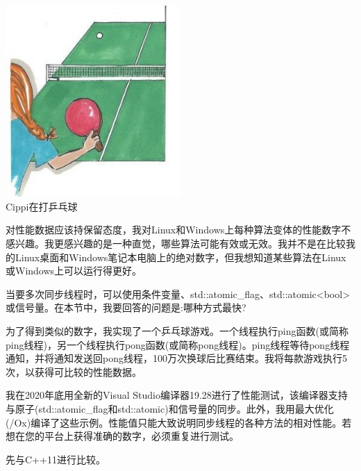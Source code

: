 
\begin{center}
\includegraphics[width=0.5\textwidth]{content/3/chapter7/images/1.png}\\
Cippi在打乒乓球
\end{center}

\begin{tcolorbox}[breakable,enhanced jigsaw,colback=blue!5!white,colframe=blue!75!black,title={具体设备的性能参考}]
对性能数据应该持保留态度，我对Linux和Windows上每种算法变体的性能数字不感兴趣。我更感兴趣的是一种直觉，哪些算法可能有效或无效。我并不是在比较我的Linux桌面和Windows笔记本电脑上的绝对数字，但我想知道某些算法在Linux或Windows上可以运行得更好。
\end{tcolorbox}

当要多次同步线程时，可以使用条件变量、std::atomic\_flag、std::atomic<bool>或信号量。在本节中，我要回答的问题是:哪种方式最快?

为了得到类似的数字，我实现了一个乒乓球游戏。一个线程执行ping函数(或简称ping线程)，另一个线程执行pong函数(或简称pong线程)。ping线程等待pong线程通知，并将通知发送回pong线程，100万次换球后比赛结束。我将每款游戏执行5次，以获得可比较的性能数据。

\begin{tcolorbox}[breakable,enhanced jigsaw,colback=blue!5!white,colframe=blue!75!black,title={关于数字}]
我在2020年底用全新的Visual Studio编译器19.28进行了性能测试，该编译器支持与原子(std::atomic\_flag和std::atomic)和信号量的同步。此外，我用最大优化(/Ox)编译了这些示例。性能值只能大致说明同步线程的各种方法的相对性能。若想在您的平台上获得准确的数字，必须重复进行测试。
\end{tcolorbox}

先与C++11进行比较。



